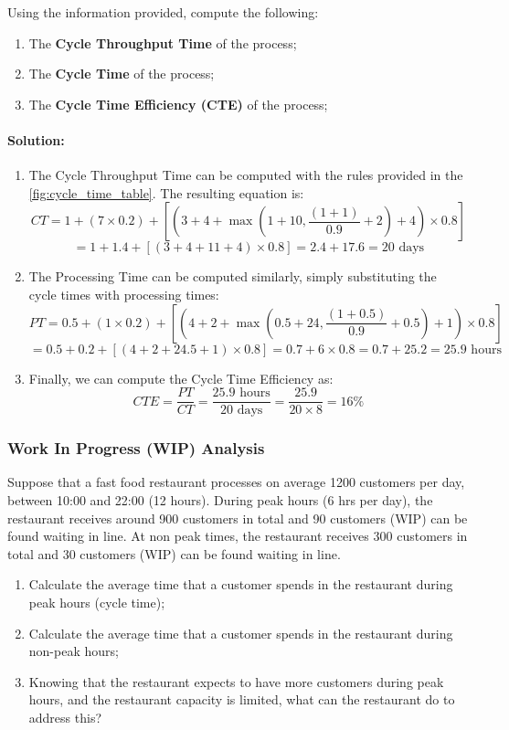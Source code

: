 Using the information provided, compute the following:
\begin{enumerate}
    \item The \textbf{Cycle Throughput Time} of the process;
    \item The \textbf{Cycle Time} of the process;
    \item The \textbf{Cycle Time Efficiency (CTE)} of the process;
\end{enumerate}
\paragraph{Solution:}
\begin{enumerate}
    \item The Cycle Throughput Time can be computed with the rules provided in the \ref{fig:cycle_time_table}. The resulting equation is:
    \[CT = 1 + (7 \times 0.2) + \left[\left(3 + 4 + \max\left(1 + 10, \frac{(1 + 1)}{0.9} + 2\right) + 4 \right) \times0.8\right]\]
    \[ = 1+ 1.4 + \left[(3 + 4 + 11 + 4) \times 0.8\right] = 2.4 + 17.6 = 20 \text{ days}\]
    \item The Processing Time can be computed similarly, simply substituting the cycle times with processing times:
    \[PT = 0.5 + (1 \times 0.2) + \left[\left(4 + 2 + \max\left(0.5 + 24, \frac{(1 + 0.5)}{0.9} + 0.5\right) + 1 \right) \times0.8\right]\]
    \[ = 0.5 + 0.2 + \left[(4 + 2 + 24.5 + 1) \times 0.8\right] = 0.7 + 6 \times 0.8 = 0.7 + 25.2 = 25.9 \text{ hours}\]
    \item Finally, we can compute the Cycle Time Efficiency as:
    \[CTE = \frac{PT}{CT} = \frac{25.9 \text{ hours}}{20 \text{ days}} = \frac{25.9}{20 \times 8} = 16\%\]
\end{enumerate}
\subsubsection{Work In Progress (WIP) Analysis}
Suppose that a fast food restaurant processes on average 1200 customers per day, between 10:00 and 22:00 (12 hours).
During peak hours (6 hrs per day), the restaurant receives around 900 customers in total and 90 customers (WIP) can be found waiting in line.
At non peak times, the restaurant receives 300 customers in total and 30 customers (WIP) can be found waiting in line.
\begin{enumerate}
    \item Calculate the average time that a customer spends in the restaurant during peak hours (cycle time);
    \item Calculate the average time that a customer spends in the restaurant during non-peak hours;
    \item Knowing that the restaurant expects to have more customers during peak hours, and the restaurant capacity is limited, what can the restaurant do to address this?
\end{enumerate}
